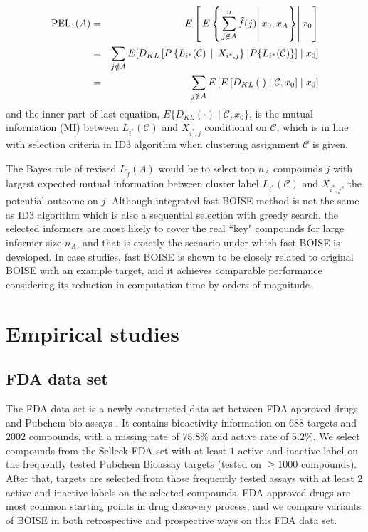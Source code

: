 \documentclass[11pt,a4paper]{article}
\theoremstyle{plain}
\begin{document}
\begin{eqnarray*}
{\rm PEL}_1(A) &=& E\left[\left. E\left\{\left. \sum_{j\not\in A}^n \tilde f(j)\right| x_0,x_A\right\}\right| x_0\right]\\
&=& \sum_{j\notin A} E[D_{KL}\left[P\left\{L_{i^*}(\mathcal C) \,\mid\, X_{i^*,j}\right\} \middle\| P\{L_{i^*}(\mathcal C)\} \right] \mid x_0]\\
&=& \sum_{j\notin A} E\left[E\left[D_{KL}\left(\cdot \right)\mid \mathcal C, x_0\right]\mid x_0\right]
\end{eqnarray*}
and the inner part of last equation, $E\{D_{KL}(\cdot)\mid \mathcal C, x_0\}$, is the mutual information (MI) between $L_{i^*}(\mathcal C)$ and $X_{i^*,j}$ conditional on $\mathcal C$, which is in line with selection criteria in ID3 algorithm when clustering assignment $\mathcal C$ is given.  

The Bayes rule of revised $L_{\tilde f}(A)$ would be to select top $n_A$ compounds $j$ with largest expected mutual information between cluster label $L_{i^*}(\mathcal C)$ and $X_{i^*,j}$, the potential outcome on $j$. 
Although integrated fast BOISE method is not the same as ID3 algorithm which is also a sequential selection with greedy search, the selected informers are most likely to cover the real ``key" compounds for large informer size $n_A$, and that is exactly the scenario under which fast BOISE is developed. 
In case studies, fast BOISE is shown to be closely related to original BOISE with an example target, and it achieves comparable performance considering its reduction in computation time by orders of magnitude. 

\section{Empirical studies}
\subsection{FDA data set}
The FDA data set is a newly constructed data set between FDA approved drugs and Pubchem bio-assays \citep{pubchem_bioassay_2017}. 
It contains bioactivity information on $688$ targets and $2002$ compounds, with a missing rate of $75.8\%$ and active rate of $5.2\%$. 
We select compounds from the Selleck FDA set with at least $1$ active and inactive label on the frequently tested Pubchem Bioassay targets (tested on $\geq 1000$ compounds). 
After that, targets are selected from those frequently tested assays with at least $2$ active and inactive labels on the selected compounds. 
FDA approved drugs are most common starting points in drug discovery process, and we compare variants of BOISE in both retrospective and prospective ways on this FDA data set.
\end{document}
